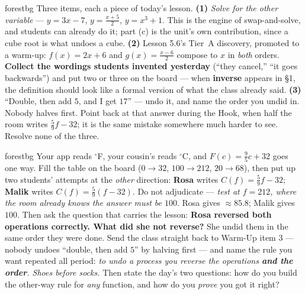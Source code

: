 \documentclass[10pt]{article}
\begin{document}
\begin{fixedskillbox}{forestbg}
    Three items, each a piece of today's lesson. \textbf{(1)} \emph{Solve for the other variable}
    --- $y=3x-7$, $y=\frac{x+5}{2}$, $y=x^{3}+1$. This is the engine of swap-and-solve, and students
    can already do it; part (c) is the unit's own contribution, since a cube root is what undoes a
    cube. \textbf{(2)} Lesson 5.6's Tier~A discovery, promoted to a warm-up: $f(x)=2x+6$ and
    $g(x)=\frac{x-6}{2}$ compose to $x$ in \emph{both} orders. \textbf{Collect the wordings students
    invented yesterday} (``they cancel,'' ``it goes backwards'') and put two or three on the board
    --- when \textbf{inverse} appears in \S1, the definition should look like a formal version of
    what the class already said. \textbf{(3)} ``Double, then add $5$, and I get $17$'' --- undo it,
    and name the order you undid in. Nobody halves first. Point back at that answer during the Hook,
    when half the room writes $\frac59f-32$; it is the same mistake somewhere much harder to see.
    Resolve none of the three.
\end{fixedskillbox}

\begin{skillbox}[Hook]{forestbg}
    Your app reads $^\circ$F, your cousin's reads $^\circ$C, and $F(c)=\frac95c+32$ goes one way.
    Fill the table on the board ($0\to32$, $100\to212$, $20\to68$), then put up two students' attempts
    at the \emph{other} direction: \textbf{Rosa} writes $C(f)=\frac59f-32$; \textbf{Malik} writes
    $C(f)=\frac59(f-32)$. Do not adjudicate --- \emph{test at $f=212$, where the room already knows
    the answer must be $100$}. Rosa gives $\approx85.8$; Malik gives $100$. Then ask the question
    that carries the lesson: \textbf{Rosa reversed both operations correctly. What did she not
    reverse?} She undid them in the same order they were done. Send the class straight back to
    Warm-Up item 3 --- nobody undoes ``double, then add $5$'' by halving first --- and name the rule
    you want repeated all period: \emph{to undo a process you reverse the operations \textbf{and the
    order}. Shoes before socks.} Then state the day's two questions: how do you build the other-way
    rule for \emph{any} function, and how do you \emph{prove} you got it right?
\end{skillbox}
\end{document}
